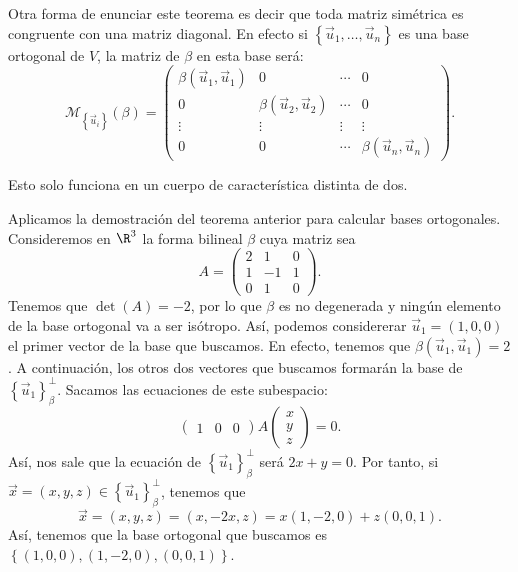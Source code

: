 \begin{observation}
	\normalfont Otra forma de enunciar este teorema es decir que toda matriz simétrica es congruente con una matriz diagonal. En efecto si $\displaystyle \left\{ \vec{u}_{1}, \ldots, \vec{u}_{n}\right\}  $ es una base ortogonal de $\displaystyle V $, la matriz de $\displaystyle \beta  $ en esta base será:
\[ \mathcal{M}_{ \left\{ \vec{u}_{i}\right\} }\left(\beta \right) = \begin{pmatrix} \beta\left(\vec{u}_{1}, \vec{u}_{1}\right) & 0 & \cdots & 0\\
0 & \beta\left(\vec{u}_{2}, \vec{u}_{2}\right) & \cdots & 0\\
\vdots & \vdots & \vdots & \vdots \\
0 & 0 & \cdots & \beta\left(\vec{u}_{n}, \vec{u}_{n}\right)\end{pmatrix} .\]
\end{observation}
\begin{observation}
\normalfont Esto solo funciona en un cuerpo de característica distinta de dos.
\end{observation}
\begin{eg}
\normalfont Aplicamos la demostración del teorema anterior para calcular bases ortogonales. Consideremos en $\displaystyle \R^{3} $ la forma bilineal $\displaystyle \beta $ cuya matriz sea
\[ A = \begin{pmatrix} 2 & 1 & 0 \\
1 & - 1 & 1 \\
0 & 1 & 0\end{pmatrix} .\]
Tenemos que $\displaystyle \det\left(A\right) = -2 $, por lo que $\displaystyle \beta  $ es no degenerada y ningún elemento de la base ortogonal va a ser isótropo. Así, podemos considererar $\displaystyle \vec{u}_{1} = \left(1,0,0\right) $ el primer vector de la base que buscamos. En efecto, tenemos que $\displaystyle \beta\left(\vec{u}_{1}, \vec{u}_{1}\right) = 2 $. A continuación, los otros dos vectores que buscamos formarán la base de $\displaystyle \left\{ \vec{u}_{1}\right\} ^{\perp }_{\beta } $. Sacamos las ecuaciones de este subespacio:
	\[ \begin{pmatrix} 1 & 0 & 0 \end{pmatrix} A \begin{pmatrix} x \\ y \\ z \end{pmatrix} = 0 .\]
	Así, nos sale que la ecuación de $\displaystyle \left\{ \vec{u}_{1}\right\} ^{\perp }_{\beta } $ será $\displaystyle 2x + y = 0 $. Por tanto, si $\displaystyle \vec{x} = \left(x,y,z\right)\in \left\{ \vec{u}_{1}\right\} ^{\perp }_{\beta } $, tenemos que
	\[ \vec{x} = \left(x,y,z\right) = \left(x,-2x,z\right) = x\left(1,-2,0\right) + z\left(0,0,1\right) .\]
	Así, tenemos que la base ortogonal que buscamos es $\displaystyle \left\{ \left(1,0,0\right), \left(1,-2,0\right),\left(0,0,1\right)\right\}  $.
\end{eg}
